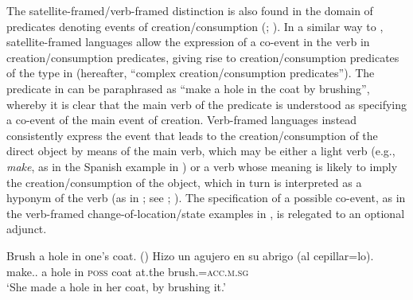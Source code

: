 \documentclass[output=paper,colorlinks,citecolor=brown]{langscibook}
\begin{document}
\noindent The satellite-framed/verb-framed distinction is also found in the domain of predicates denoting events of creation/consumption (\citealt{Mateu2003}; \citeyear{Mateu2012}). In a similar way to , satellite-framed languages allow the expression of a co-event in the verb in creation/consumption predicates, giving rise to creation/consumption predicates of the type in  (hereafter, ``complex creation/consumption predicates''). The predicate in  can be paraphrased as ``make a hole in the coat by brushing'', whereby it is clear that the main verb of the predicate is understood as specifying a co-event of the main event of creation. Verb-framed languages instead consistently express the event that leads to the creation/consumption of the direct object by means of the main verb, which may be either a light verb (e.g., \textit{make}, as in the Spanish example in ) or a verb whose meaning is likely to imply the creation/consumption of the object, which in turn is interpreted as a hyponym of the verb (as in ; see \citealt{HaleAndKeyser1997b}; \citeyear{HaleAndKeyser2002}). The specification of a possible co-event, as in the verb-framed change-of-location/state examples in , is relegated to an optional adjunct.

\ea \label{mainbla} \ea \label{bla5} Brush a hole in one's coat. \hfill (\citealt[279]{LevinAndRapoport1988})
\ex \gll Hizo un agujero en su abrigo (al cepillar=lo).\\
make.{\PST.\AGR} a hole in \textsc{poss} coat \hspace{3pt}at.the brush.{\INF}=\textsc{acc.m.sg}\\\glt
`She made a hole in her coat, by brushing it.' \label{bla6}
\z \z
\end{document}
